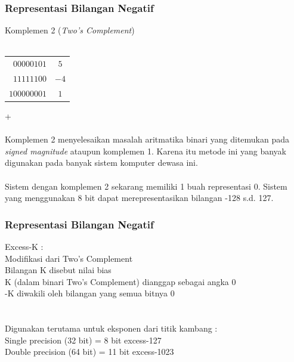 \documentclass{beamer}
\begin{document}
\begin{frame}
\frametitle{Representasi Bilangan Negatif}
Komplemen 2 (\textit{Two's Complement})
\\\ \\\begin{tabular}{rc}
	$00000101$ & $5$\\
	$11111100$ & $-4$\\
	\hline
	$100000001$ & $1$\\
\end{tabular}+
\\\ \\Komplemen 2 menyelesaikan masalah aritmatika binari yang ditemukan pada \textit{signed magnitude} ataupun komplemen 1. Karena itu metode ini yang banyak digunakan pada banyak sistem komputer dewasa ini.
\\\ \\Sistem dengan komplemen 2 sekarang memiliki 1 buah representasi 0. Sistem yang menggunakan 8 bit dapat merepresentasikan bilangan -128 s.d. 127.
\end{frame}


\begin{frame}
\frametitle{Representasi Bilangan Negatif}
Excess-K :
\\Modifikasi dari Two's Complement
\\Bilangan K disebut nilai bias
\\K (dalam binari Two's Complement) dianggap sebagai angka 0 
\\-K diwakili oleh bilangan yang semua bitnya 0
\\\
\\\
\\Digunakan terutama untuk eksponen dari titik kambang :
\\Single precision (32 bit) = 8 bit excess-127
\\Double precision (64 bit) = 11 bit excess-1023
\\\ 
\\\ 
\\\ 
\\\ 
\end{frame}

\end{document}
